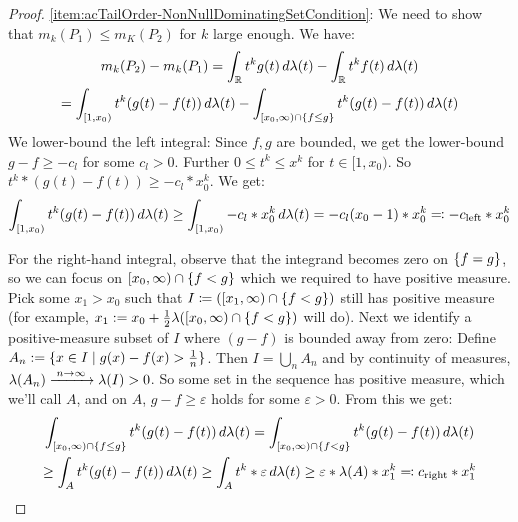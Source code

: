 \documentclass[a4paper]{scrreprt}
\let\epsilon\varepsilon
\begin{document}
    \begin{proof}
        \ref{item:acTailOrder-NonNullDominatingSetCondition}:
        We need to show that $m_k(P_1) \leq m_K(P_2)$ for $k$ large enough. We have:
        \begin{multline*}
            m_k(P_2) - m_k(P_1)
            = \int_{\mathbb{R}} t^k g(t) \, d\lambda(t) - \int_{\mathbb{R}} t^k f(t) \, d\lambda(t) \\
            = \int_{[1, x_0)} t^k(g(t) - f(t)) \, d\lambda(t) 
              - \int_{[x_0, \infty)\cap \{f \leq g\}} t^k(g(t) - f(t)) \, d\lambda(t)
        \end{multline*}
        We lower-bound the left integral:
        Since $f, g$ are bounded, we get the lower-bound $g-f \geq - c_l$ for some $c_l > 0$.
        Further $0 \leq t^k \leq x^k$ for $t \in [1, x_0)$. So $t^k*(g(t) - f(t)) \geq -c_l*x_0^k$.
        We get:
        \begin{multline*}
            \int_{[1, x_0)} t^k(g(t) - f(t)) \, d\lambda(t)
            \geq \int_{[1, x_0)} -c_l*x_0^k \, d\lambda(t)
            = -c_l (x_0 - 1)*x_0^k 
            \eqqcolon -c_{\text{left}} * x_0^k
        \end{multline*}
        
        For the right-hand integral, observe that the integrand becomes zero on $\{f = g\}$, so we can focus on $[x_0, \infty) \cap \{f < g\}$ which we required to have positive measure.
        Pick some $x_1 > x_0$ such that $I \coloneqq ([x_1, \infty) \cap \{f < g\})$ still has positive measure (for example, $x_1 := x_0 + \frac{1}{2} \lambda([x_0, \infty) \cap \{f < g\})$ will do).
        Next we identify a positive-measure subset of $I$ where $(g-f)$ is bounded away from zero:
        Define $A_n := \{x \in I \mid g(x) - f(x) > \frac{1}{n}\}$.
        Then $I = \bigcup_n A_n$ and by continuity of measures, $\lambda(A_n) \xrightarrow{\;n \to \infty\;} \lambda(I) > 0$. So some set in the sequence has positive measure, which we'll call $A$, and on $A$, $g-f \geq \epsilon$ holds for some $\epsilon > 0$. From this we get:
        \begin{multline*}
            \lintegral{[x_0, \infty)\cap \set{f \leq g}}{t^k(g(t) - f(t))}{\lambda(t)}
            = \lintegral{[x_0, \infty)\cap \set{f < g}}{t^k(g(t) - f(t))}{\lambda(t)} \\
            \geq \lintegral{A}{t^k(g(t) - f(t))}{\lambda(t)}
            \geq \lintegral{A}{t^k*\epsilon}{\lambda(t)}
            \geq \epsilon*\lambda(A)*x_1^k
            \eqqcolon c_{\text{right}}*x_1^k
        \end{multline*}
        

\end{proof}
\end{document}
